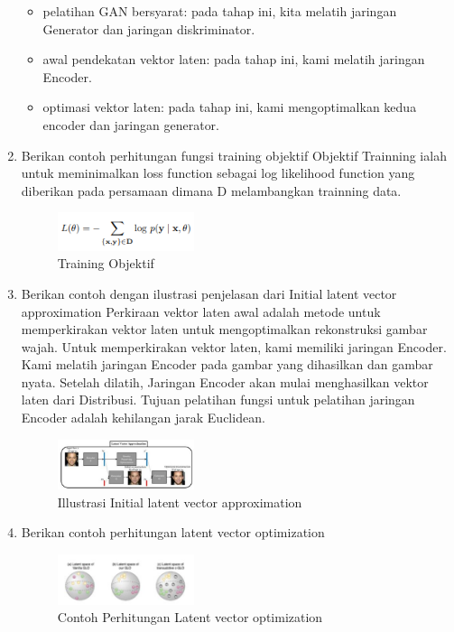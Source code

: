 \begin{enumerate}
	\begin{itemize} 
			\item pelatihan GAN bersyarat: pada tahap ini, kita melatih jaringan Generator dan jaringan diskriminator.
    		\item awal pendekatan vektor laten: pada tahap ini, kami melatih jaringan Encoder.
    		\item optimasi vektor laten: pada tahap ini, kami mengoptimalkan kedua encoder dan jaringan generator.
		\end{itemize}
	\item Berikan contoh perhitungan fungsi training objektif
	\hfill \break
		Objektif Trainning ialah untuk meminimalkan loss function sebagai log likelihood function yang diberikan pada persamaan dimana D melambangkan trainning data.

	\begin{figure}[H]
		\includegraphics[width=4cm]{figures/1174003/9/teori8.PNG}
            	\centering
           	 \caption{Training Objektif}
       	 \end{figure}
	
	\item Berikan contoh dengan ilustrasi penjelasan dari Initial latent vector approximation
	\hfill \break
	Perkiraan vektor laten awal adalah metode untuk memperkirakan vektor laten untuk mengoptimalkan rekonstruksi gambar wajah. Untuk memperkirakan vektor laten, kami memiliki jaringan Encoder. Kami melatih jaringan Encoder pada gambar yang dihasilkan dan gambar nyata. Setelah dilatih, Jaringan Encoder akan mulai menghasilkan vektor laten dari Distribusi. Tujuan pelatihan fungsi untuk pelatihan jaringan Encoder adalah kehilangan jarak Euclidean.

	\begin{figure}[H]
		\includegraphics[width=4cm]{figures/1174003/9/teori9.PNG}
		\centering
		\caption{Illustrasi Initial latent vector approximation}
	\end{figure}
	\item Berikan contoh perhitungan latent vector optimization
	\hfill \break
	
	\begin{figure}[H]
		\includegraphics[width=4cm]{figures/1174003/9/teori10.PNG}
		\centering
		\caption{Contoh Perhitungan Latent vector optimization}
	\end{figure}

\end{enumerate}

